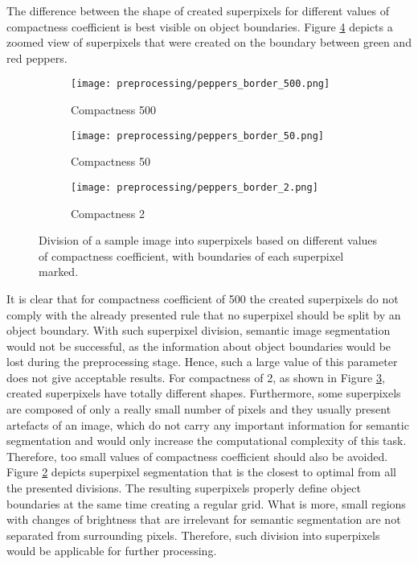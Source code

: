 The difference between the shape of created superpixels for different values of compactness coefficient is best visible on object boundaries. Figure \ref{fig:peppers_boundaries_zoom} depicts a zoomed view of superpixels that were created on the boundary between green and red peppers.
\begin{figure}[ht]
 \centering
  \begin{subfigure}[h]{0.32\textwidth}
    \texttt{[image: preprocessing/peppers\_border\_500.png]}
    \caption{Compactness 500}
    \label{fig:peppers_boundaries_zoom_500}
  \end{subfigure}
  \begin{subfigure}[h]{0.32\textwidth}
    \texttt{[image: preprocessing/peppers\_border\_50.png]}
    \caption{Compactness 50}
    \label{fig:peppers_boundaries_zoom_50}
  \end{subfigure}
    \begin{subfigure}[h]{0.32\textwidth}
    \texttt{[image: preprocessing/peppers\_border\_2.png]}
    \caption{Compactness 2}
    \label{fig:peppers_boundaries_zoom_2}
  \end{subfigure}
     \caption{Division of a sample image into superpixels based on different values of compactness coefficient, with boundaries of each superpixel marked.}%
    \label{fig:peppers_boundaries_zoom} 
\end{figure}
\newline
It is clear that for compactness coefficient of 500 the created superpixels do not comply with the already presented rule that no superpixel should be split by an object boundary. With such superpixel division, semantic image segmentation would not be successful, as the information about object boundaries would be lost during the preprocessing stage. Hence, such a large value of this parameter does not give acceptable results. For compactness of 2, as shown in Figure \ref{fig:peppers_boundaries_zoom_2}, created superpixels have totally different shapes. Furthermore, some superpixels are composed of only a really small number of pixels and they usually present artefacts of an image, which do not carry any important information for semantic segmentation and would only increase the computational complexity of this task. Therefore, too small values of compactness coefficient should also be avoided. Figure \ref{fig:peppers_boundaries_zoom_50} depicts superpixel segmentation that is the closest to optimal from all the presented divisions. The resulting superpixels properly define object boundaries at the same time creating a regular grid. What is more, small regions with changes of brightness that are irrelevant for semantic segmentation are not separated from surrounding pixels. Therefore, such division into superpixels would be applicable for further processing.

